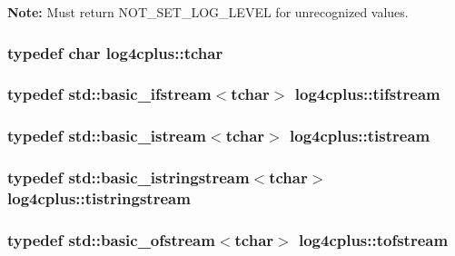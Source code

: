 {\bfseries Note\-:} Must return {\ttfamily N\-O\-T\-\_\-\-S\-E\-T\-\_\-\-L\-O\-G\-\_\-\-L\-E\-V\-E\-L} for unrecognized values. \hypertarget{namespacelog4cplus_a7b80b5711ae9e7a1ddd97dbaefbe3583}{
\subsubsection[{tchar}]{\setlength{\rightskip}{0pt plus 5cm}typedef char {\bf log4cplus\-::tchar}}}\label{namespacelog4cplus_a7b80b5711ae9e7a1ddd97dbaefbe3583}
\hypertarget{namespacelog4cplus_a023f485e6c5f8b014d1283192aaee983}{
\subsubsection[{tifstream}]{\setlength{\rightskip}{0pt plus 5cm}typedef std\-::basic\-\_\-ifstream$<${\bf tchar}$>$ {\bf log4cplus\-::tifstream}}}\label{namespacelog4cplus_a023f485e6c5f8b014d1283192aaee983}
\hypertarget{namespacelog4cplus_aa09fa8d7ec3f48e80ed15d5a1dbc38a7}{
\subsubsection[{tistream}]{\setlength{\rightskip}{0pt plus 5cm}typedef std\-::basic\-\_\-istream$<${\bf tchar}$>$ {\bf log4cplus\-::tistream}}}\label{namespacelog4cplus_aa09fa8d7ec3f48e80ed15d5a1dbc38a7}
\hypertarget{namespacelog4cplus_a97831e9182bf2d2fe27e1296d9881428}{
\subsubsection[{tistringstream}]{\setlength{\rightskip}{0pt plus 5cm}typedef std\-::basic\-\_\-istringstream$<${\bf tchar}$>$ {\bf log4cplus\-::tistringstream}}}\label{namespacelog4cplus_a97831e9182bf2d2fe27e1296d9881428}
\hypertarget{namespacelog4cplus_a2f9380184debead93aa014e022fca22e}{
\subsubsection[{tofstream}]{\setlength{\rightskip}{0pt plus 5cm}typedef std\-::basic\-\_\-ofstream$<${\bf tchar}$>$ {\bf log4cplus\-::tofstream}}}\label{namespacelog4cplus_a2f9380184debead93aa014e022fca22e}
